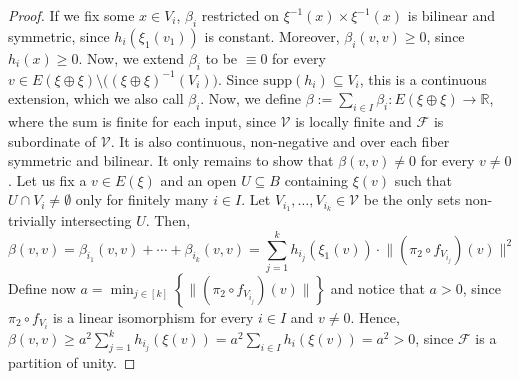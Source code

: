 \begin{proof}
If we fix some $x\in V_i$, $\beta_i$ restricted on $\xi^{-1}(x)\times\xi^{-1}(x)$ is bilinear and symmetric, since $h_i(\xi_1(v_1))$ is constant. Moreover, $\beta_i(v,v)\geq0$, since $h_i(x)\geq0$. Now, we extend $\beta_i$ to be $\equiv0$ for every $v\in E(\xi\oplus\xi)\setminus\big((\xi\oplus\xi)^{-1}(V_i)\big)$. Since $\mathrm{supp}(h_i)\subseteq V_i$, this is a continuous extension, which we also call $\beta_i$. Now, we define $\beta:=\sum_{i\in I}\beta_i:E(\xi\oplus\xi)\to\mathbb{R}$, where the sum is finite for each input, since $\mathcal{V}$ is locally finite and $\mathcal{F}$ is subordinate of $\mathcal{V}$. It is also continuous, non-negative and over each fiber symmetric and bilinear. It only remains to show that $\beta(v,v)\neq0$ for every $v\neq0$. Let us fix a $v\in E(\xi)$ and an open $U\subseteq B$ containing $\xi(v)$ such that $U\cap V_i\neq\emptyset$ only for finitely many $i\in I$. Let $V_{i_1},\ldots,V_{i_k}\in\mathcal{V}$ be the only sets non-trivially intersecting $U$. Then,  \[\beta(v,v)=\beta_{i_1}(v,v)+\cdots+\beta_{i_k}(v,v)=\sum_{j=1}^kh_{i_j}(\xi_1(v))\cdot\big\|(\pi_2\circ f_{V_{i_j}})(v)\big\|^2\]
Define now $a=\min_{j\in[k]}\left\{\big\|(\pi_2\circ f_{V_{i_j}})(v)\big\|\right\}$ and notice that $a>0$, since $\pi_2\circ f_{V_i}$ is a linear isomorphism for every $i\in I$ and $v\neq0$. Hence, $\beta(v,v)\geq a^2\sum_{j=1}^kh_{i_j}(\xi(v))=a^2\sum_{i\in I}h_i(\xi(v))=a^2>0$, since $\mathcal{F}$ is a partition of unity.
\end{proof}

